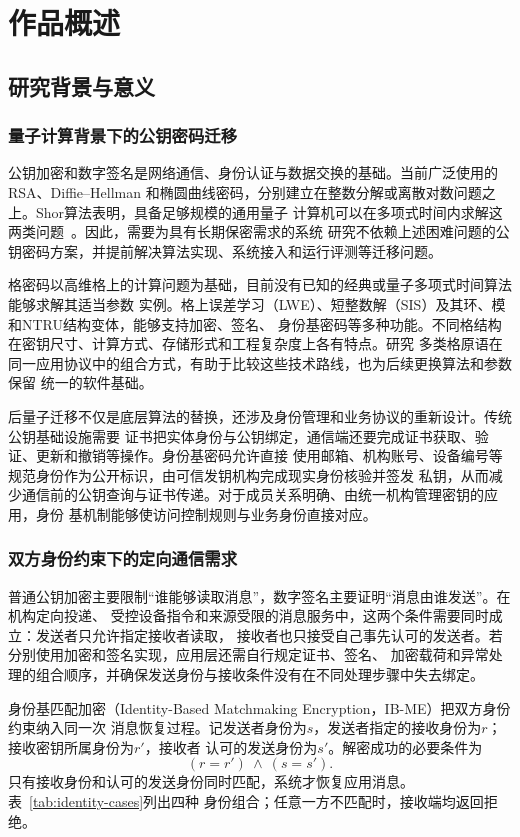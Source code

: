 \chapter{作品概述}

\section{研究背景与意义}

\subsection{量子计算背景下的公钥密码迁移}

公钥加密和数字签名是网络通信、身份认证与数据交换的基础。当前广泛使用的RSA、Diffie--Hellman
和椭圆曲线密码，分别建立在整数分解或离散对数问题之上。Shor算法表明，具备足够规模的通用量子
计算机可以在多项式时间内求解这两类问题~\cite{shor1994}。因此，需要为具有长期保密需求的系统
研究不依赖上述困难问题的公钥密码方案，并提前解决算法实现、系统接入和运行评测等迁移问题。

格密码以高维格上的计算问题为基础，目前没有已知的经典或量子多项式时间算法能够求解其适当参数
实例。格上误差学习（LWE）、短整数解（SIS）及其环、模和NTRU结构变体，能够支持加密、签名、
身份基密码等多种功能。不同格结构在密钥尺寸、计算方式、存储形式和工程复杂度上各有特点。研究
多类格原语在同一应用协议中的组合方式，有助于比较这些技术路线，也为后续更换算法和参数保留
统一的软件基础。

后量子迁移不仅是底层算法的替换，还涉及身份管理和业务协议的重新设计。传统公钥基础设施需要
证书把实体身份与公钥绑定，通信端还要完成证书获取、验证、更新和撤销等操作。身份基密码允许直接
使用邮箱、机构账号、设备编号等规范身份作为公开标识，由可信发钥机构完成现实身份核验并签发
私钥，从而减少通信前的公钥查询与证书传递。对于成员关系明确、由统一机构管理密钥的应用，身份
基机制能够使访问控制规则与业务身份直接对应。

\subsection{双方身份约束下的定向通信需求}

普通公钥加密主要限制“谁能够读取消息”，数字签名主要证明“消息由谁发送”。在机构定向投递、
受控设备指令和来源受限的消息服务中，这两个条件需要同时成立：发送者只允许指定接收者读取，
接收者也只接受自己事先认可的发送者。若分别使用加密和签名实现，应用层还需自行规定证书、签名、
加密载荷和异常处理的组合顺序，并确保发送身份与接收条件没有在不同处理步骤中失去绑定。

身份基匹配加密（Identity-Based Matchmaking Encryption，IB-ME）把双方身份约束纳入同一次
消息恢复过程。记发送者身份为$s$，发送者指定的接收身份为$r$；接收密钥所属身份为$r'$，接收者
认可的发送身份为$s'$。解密成功的必要条件为
\[
  (r=r')\ \land\ (s=s').
\]
只有接收身份和认可的发送身份同时匹配，系统才恢复应用消息。表~\ref{tab:identity-cases}列出四种
身份组合；任意一方不匹配时，接收端均返回拒绝。

